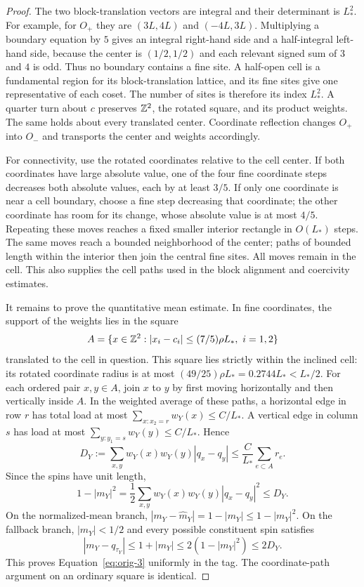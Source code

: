 \begin{proof}
The two block-translation vectors are integral and their determinant is
$L_*^2$.  For example, for $O_+$ they are $(3L,4L)$ and $(-4L,3L)$.
Multiplying a boundary equation by $5$ gives an integral right-hand side
and a half-integral left-hand side, because the center is $(1/2,1/2)$
and each relevant signed sum of $3$ and $4$ is odd.  Thus no boundary
contains a fine site.  A half-open cell is a fundamental region for its
block-translation lattice, and its fine sites give one representative
of each coset.  The number of sites is therefore its index $L_*^2$.
A quarter turn about $c$ preserves $\mathbb Z^2$, the rotated square, and its
product weights.  The same holds about every translated center.
Coordinate reflection changes $O_+$ into $O_-$ and transports the
center and weights accordingly.

For connectivity, use the rotated coordinates relative to the cell
center.  If both coordinates have large absolute value, one of the
four fine coordinate steps decreases both absolute values, each by
at least $3/5$.  If only one coordinate is near a cell boundary, choose
a fine step decreasing that coordinate; the other coordinate has room
for its change, whose absolute value is at most $4/5$.  Repeating these
moves reaches a fixed smaller interior rectangle in $O(L_*)$ steps.
The same moves reach a bounded neighborhood of the center; paths of
bounded length within the interior then join the central fine sites.
All moves remain in the cell.  This also supplies the cell paths used
in the block alignment and coercivity estimates.

It remains to prove the quantitative mean estimate.  In fine coordinates,
the support of the weights lies in the square
\[
 A=\{x\in\Z^2: |x_i-c_i|\le (7/5)\rho L_*,\ i=1,2\}
\]
translated to the cell in question.  This square lies strictly within
the inclined cell: its rotated coordinate radius is at most
$(49/25)\rho L_*=0.2744L_*<L_*/2$.
For each ordered pair $x,y\in A$, join $x$ to $y$ by first moving
horizontally and then vertically inside $A$.  In the weighted average
of these paths, a horizontal edge in row $r$ has total load at most
$\sum_{x:x_2=r}w_Y(x)\le C/L_*$.  A vertical edge in column $s$ has
load at most $\sum_{y:y_1=s}w_Y(y)\le C/L_*$.  Hence
\[
 D_Y:=\sum_{x,y}w_Y(x)w_Y(y)|q_x-q_y|
 \le \frac{C}{L_*}\sum_{e\subset A}r_e.
\]
Since the spins have unit length,
\[
 1-|m_Y|^2
 =\frac12\sum_{x,y}w_Y(x)w_Y(y)|q_x-q_y|^2
 \le D_Y.
\]
On the normalized-mean branch,
$|m_Y-\widehat m_Y|=1-|m_Y|\le1-|m_Y|^2$.
On the fallback branch, $|m_Y|<1/2$ and every possible constituent
spin satisfies
\[
 |m_Y-q_{\tau_Y}|\le1+|m_Y|
 \le2(1-|m_Y|^2)\le2D_Y.
\]
This proves Equation~\eqref{eq:orig-3} uniformly in the tag.
The coordinate-path argument on an ordinary square is identical.
\end{proof}


